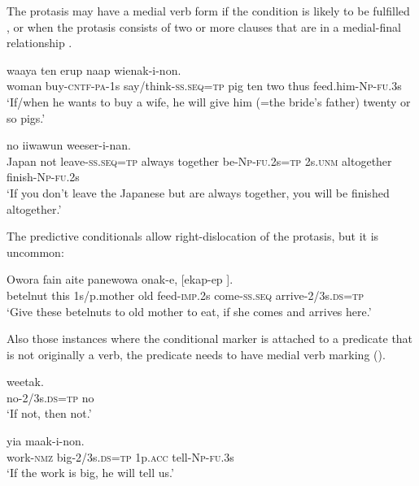 The protasis may have a medial verb form if the condition is likely to be fulfilled , or when the protasis consists of two or more clauses that are in a medial-final relationship .

\ea%
\label{ex:8:x1654}
\gll [Emeria  \textstyleEmphasizedVernacularWords{sesenar-ek-a-m} \textstyleEmphasizedVernacularWords{na-ep=na}] waaya  ten  erup naap  wienak-i-non.\\
woman  buy-\textsc{cntf}-\textsc{pa}-1s say/think-\textsc{ss}.\textsc{seq}=\textsc{tp} pig  ten  two thus  feed.him-\textsc{Np}-\textsc{fu}.3s\\
\glt`If/when he wants to buy a wife, he will give him (=the bride's father) twenty or so pigs.'
\z


\ea%
\label{ex:8:x1653}
\gll [Yaapan  me  \textstyleEmphasizedVernacularWords{piipu-ap=na}  anane  epaskun  ika-i-nan=na] no  iiwawun  weeser-i-nan.
\\
Japan  not  leave-\textsc{ss}.\textsc{seq}=\textsc{tp} always together  be-\textsc{Np}-\textsc{fu}.2s=\textsc{tp} 2s.\textsc{unm} altogether  finish-\textsc{Np}-\textsc{fu}.2s\\
\glt`If you don't leave the Japanese but are always together, you will be finished altogether.'
\z


The predictive conditionals allow right-dislocation of the protasis, but it is uncommon: 

\ea%
\label{ex:8:x1662}
\gll Owora  fain  aite  panewowa  onak-e,  [ekap-ep ]. \\
betelnut  this  1s/p.mother  old  feed-\textsc{imp}.2s come-\textsc{ss}.\textsc{seq} arrive-2/3s.\textsc{ds}=\textsc{tp}\\
\glt`Give these betelnuts to old mother to eat, if she comes and arrives here.'
\z


Also those instances where the conditional marker is attached to a predicate that is not originally a verb, the predicate needs to have medial verb marking ().

\ea%
\label{ex:8:x1660}
\gll [\textstyleEmphasizedVernacularWords{Weetak-eya}\textstyleEmphasizedVernacularWords{=na}]  weetak.\\
no-2/3s.\textsc{ds}=\textsc{tp} no\\
\glt`If not, then not.'
\z


\ea%
\label{ex:8:x1661}
\gll [Mauw-owa  \textstyleEmphasizedVernacularWords{manek-aya=na}]  yia  maak-i-non.\\
work-\textsc{nmz} big-2/3s.\textsc{ds}=\textsc{tp} 1p.\textsc{acc} tell-\textsc{Np}-\textsc{fu}.3s\\
\glt`If the work is big, he will tell us.'
\z



